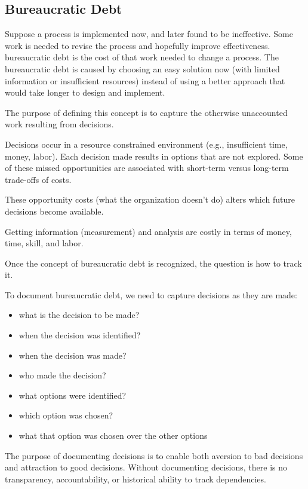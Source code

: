 \subsection{Bureaucratic Debt}


Suppose a process is implemented now, and later found to be ineffective. Some work is needed to revise the process and hopefully improve effectiveness. \gls{bureaucratic debt} is the cost of that work needed to change a process. The bureaucratic debt is caused by choosing an easy solution now (with limited information or insufficient resources) instead of using a better approach that would take longer to design and implement.

The purpose of defining this concept is to capture the otherwise unaccounted work resulting from decisions.


Decisions occur in a resource constrained environment (e.g., insufficient time, money, labor). Each decision made results in options that are not explored. Some of these missed opportunities are associated with short-term versus long-term trade-offs of costs.

These opportunity costs (what the organization doesn't do) alters which future decisions become available.

Getting information (measurement) and analysis are costly in terms of money, time, skill, and labor.

Once the concept of bureaucratic debt is recognized, the question is how to track it.

To document bureaucratic debt, we need to capture decisions as they are made:
\begin{itemize}
    \item what is the decision to be made?
    \item when the decision was identified?
    \item when the decision was made?
    \item who made the decision?
    \item what options were identified?
    \item which option was chosen?
    \item what that option was chosen over the other options
\end{itemize}
The purpose of documenting decisions is to enable both aversion to bad decisions and attraction to good decisions. Without documenting decisions, there is no transparency, accountability, or historical ability to track dependencies. 

